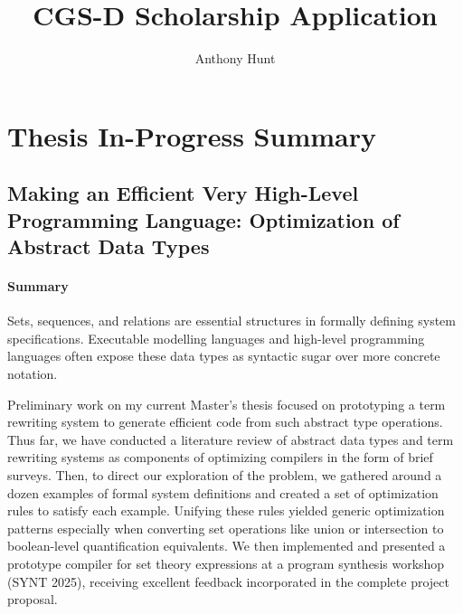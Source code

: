 \documentclass[12pt]{article}
\title{CGS-D Scholarship Application}
\author{Anthony Hunt}
\begin{document}
\maketitle

\section{Thesis In-Progress Summary}

\subsection{Making an Efficient Very High-Level Programming Language: Optimization of Abstract Data Types}

\paragraph{Summary}
Sets, sequences, and relations are essential structures in formally defining system specifications. Executable modelling languages and high-level programming languages often expose these data types as syntactic sugar over more concrete notation.

Preliminary work on my current Master's thesis focused on prototyping a term rewriting system to generate efficient code from such abstract type operations. Thus far, we have conducted a literature review of abstract data types and term rewriting systems as components of optimizing compilers in the form of brief surveys. Then, to direct our exploration of the problem, we gathered around a dozen examples of formal system definitions and created a set of optimization rules to satisfy each example. Unifying these rules yielded generic optimization patterns especially when converting set operations like union or intersection to boolean-level quantification equivalents. We then implemented and presented a prototype compiler for set theory expressions at a program synthesis workshop (SYNT 2025), receiving excellent feedback incorporated in the complete project proposal.


\pagebreak
\end{document}
